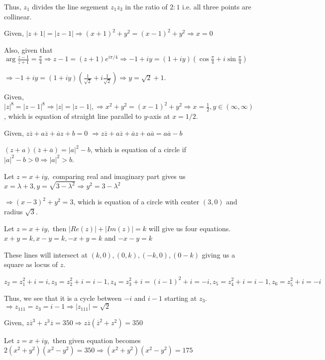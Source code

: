   Thus, $z_1$ divides the line segement $z_1z_3$ in the ratio of $2:1$ i.e. all three points are collinear.
\item Given, $|z + 1| = |z - 1| \Rightarrow (x + 1)^2 + y^2 = (x - 1)^2 + y^2 \Rightarrow x = 0$

  Also, given that $\arg\frac{z - 1}{z + 1} = \frac{\pi}{4}\Rightarrow z - 1 = (z + 1)e^{i\pi/4} \Rightarrow
  -1 + iy = (1 + iy)\left(\cos\frac{\pi}{4} + i\sin\frac{\pi}{4}\right)$

  $\Rightarrow -1 + iy = (1 + iy)\left(\frac{1}{\sqrt{2}} + i\frac{1}{\sqrt{2}}\right)\Rightarrow y =
  \sqrt{2} + 1$.
\item Given, $|z|^8 = |z - 1|^8 \Rightarrow |z| = |z - 1|, \Rightarrow x^2 + y^2 = (x - 1)^2 + y^2
  \Rightarrow x = \frac{1}{2}, y\in(\infty, \infty)$,
  which is equation of straight line parallel to $y$-axis at $x = 1/2.$
\item Given, $z\overline{z} + a\overline{z} + \overline{a}z + b = 0$
  $\Rightarrow z\overline{z} + a\overline{z} + \overline{a}z + a\overline{a} = a\overline{a} - b$

  $(z + a)(\overline{z} + \overline{a}) = |a|^2 - b$,
  which is equation of a circle if $|a|^2 - b > 0 \Rightarrow |a|^2 > b$.
\item Let $z = x + iy,$ comparing real and imaginary part gives us
  $x = \lambda + 3, y = \sqrt{3 - \lambda^2} \Rightarrow y^2 = 3 - \lambda^2$

  $\Rightarrow (x - 3)^2 + y^2 = 3$,
  which is equation of a circle with center $(3, 0)$ and radius $\sqrt{3}$.
\item Let $z = x + iy,$ then $|Re(z)| + |Im(z)| = k$ will give us four equations. $x + y = k, x - y = k, -x + y = k$ and $-x - y = k$

  These lines will intersect at $(k, 0), (0, k), (-k, 0), (0 -k)$ giving us a square as locus of $z.$
\item $z_2 = z_1^2 + i = i, z_3 = z_2^2 + i = i - 1, z_4 = z_3^2 + i = (i - 1)^2 + i = -i, z_5 = z_4^2 + i =
  i - 1, z_6 = z_5^2 + i = -i$

  Thus, we see that it is a cycle between $-i$ and $i - 1$ starting at $z_3.$
  $\Rightarrow z_{111} = z_3 = i - 1 \Rightarrow |z_{111}| = \sqrt{2}$
\item Given, $z\overline{z}^3 + z^3\overline{z} = 350 \Rightarrow z\overline{z}(\overline{z}^2 + z^2) = 350$

  Let $z = x + iy,$ then given equation becomes $2(x^2 + y^2)(x^2 - y^2) = 350 \Rightarrow (x^2 + y^2)(x^2 -
  y^2) = 175$

